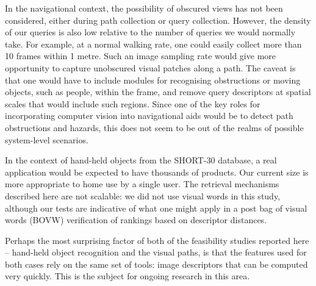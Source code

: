 In the navigational context, the possibility of obscured views has not been considered, either during path collection or query collection. However, the density of our queries is also low relative to the number of queries we would normally take. For example, at a normal walking rate, one could easily collect more than 10 frames within 1 metre. Such an image sampling rate would give more opportunity to capture unobscured visual patches along a path. The caveat is that one would have to include modules for recognising obstructions or moving objects, such as people, within the frame, and remove query descriptors at  spatial scales that would include such regions. Since one of the key roles for incorporating computer vision into navigational aids would be to detect path obstructions and hazards, this does not seem to be out of the realms of possible system-level scenarios.

In the context of hand-held objects from the SHORT-30 database, a real application would be expected to have thousands of products.  Our current size is more appropriate to home use by a single user. The retrieval mechanisms described here are not scalable: we did not use visual words in this study, although our tests are indicative of what one might apply in a post bag of visual words (BOVW) verification of rankings based on descriptor distances.

Perhaps the most surprising factor of both of the feasibility studies reported here -- hand-held object recognition and the visual paths, is that the features used for both cases rely on the same set of tools: image descriptors that can be computed very quickly.  This is the subject for ongoing research in this area.


